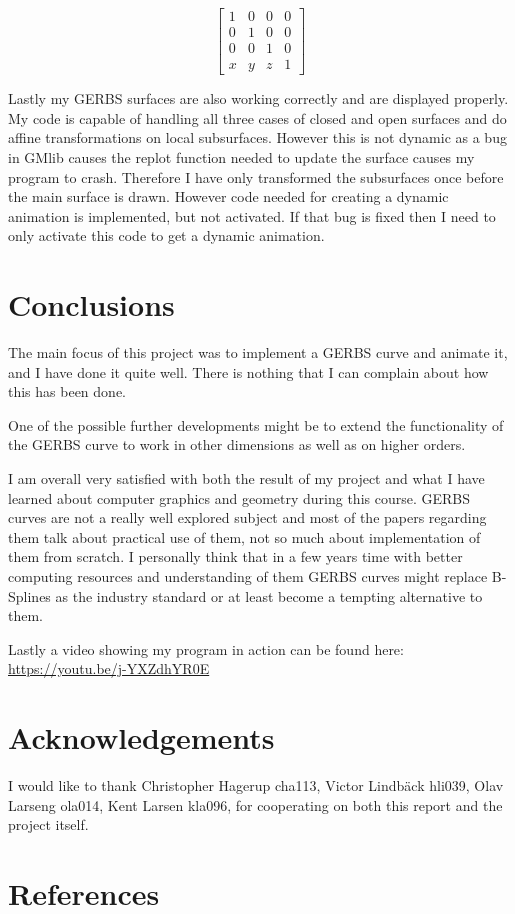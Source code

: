 \documentclass[a4paper,12pt]{extarticle}
\begin{document}
\begin{equation}
\begin{bmatrix}
1&0&0&0\\
0&1&0&0\\
0&0&1&0\\
x&y&z&1
\end{bmatrix}
\label{eq:TranslationMatrix}
\end{equation}

Lastly my GERBS surfaces are also working correctly and are displayed properly. My code is capable of handling all three cases of closed and open surfaces and do affine transformations on local subsurfaces. However this is not dynamic as a bug in GMlib causes the replot function needed to update the surface causes my program to crash. Therefore I have only transformed the subsurfaces once before the main surface is drawn. However code needed for creating a dynamic animation is implemented, but not activated. If that bug is fixed then I need to only activate this code to get a dynamic animation.

\section{Conclusions}
The main focus of this project was to implement a GERBS curve and animate it, and I have done it quite well. There is nothing that I can complain about how this has been done.

One of the possible further developments might be to extend the functionality of the GERBS curve to work in other dimensions as well as on higher orders.

I am overall very satisfied with both the result of my project and what I have learned about computer graphics and geometry during this course. GERBS curves are not a really well explored subject and most of the papers regarding them talk about practical use of them, not so much about implementation of them from scratch. I personally think that in a few years time with better computing resources and understanding of them GERBS curves might replace B-Splines as the industry standard or at least become a tempting alternative to them.

Lastly a video showing my program in action can be found here: \url{https://youtu.be/j-YXZdhYR0E}

\section{Acknowledgements}
I would like to thank Christopher Hagerup cha113, Victor Lindb\"{a}ck hli039, Olav Larseng ola014, Kent Larsen kla096, for cooperating on both this report and the project itself.
 
\section{References}
\begingroup
\def\section*#1{}


\endgroup
\end{document}
